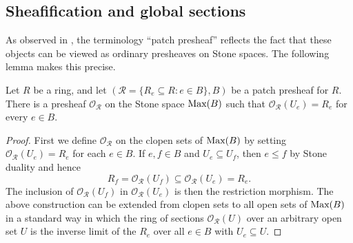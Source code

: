 \documentclass[11pt]{amsart}
\def\O{{\mathcal{O}}}
\begin{document}
\subsection[Sheafification and global sections]{Sheafification and global sections}\label{subsec: sheafification and global sections}

As observed in \cite[Section~3.2]{CosOlb}, the terminology ``patch presheaf'' reflects the fact that these objects can be viewed as ordinary presheaves on Stone spaces. The following lemma makes this precise.

\begin{lemma} \label{lem: presheaf from patch} Let $R$ be a ring, and let $({{\mathcal R}}=\{R_e\subseteq R:e\in B\}, B)$ be a patch presheaf for $R$. There is a presheaf $\O_{{\mathcal R}}$ on the Stone space $\mbox{\rm Max}(B)$ such that $\O_{{\mathcal R}}(U_e) = R_e$ for every $e\in B$. 
\end{lemma} 
\begin{proof} 
First we define $\O_{{\mathcal R}}$ on the clopen sets of   $\mbox{\rm Max}(B)$ by setting  $\O_{{\mathcal R}}(U_e) = R_e$ for each $e \in B$.
If $e,f \in B$ and $U_e \subseteq U_f$, then $e\le f$  by Stone duality and hence $$R_f = \O_{\mathcal R}(U_f) \subseteq \O_{\mathcal R}(U_e)=R_e.$$ The inclusion of $\O_{\mathcal R}(U_f)$ in $\O_{\mathcal R}(U_e)$ is then the restriction morphism.   The above construction can be extended from clopen sets to all open sets of $\mbox{\rm Max}(B)$ in a standard way in which the ring of sections $\O_{{\mathcal R}}(U)$ over an arbitrary open set $U$ is the inverse limit of the $R_e$ over all $e\in B$ with $U_e\subseteq U$.
\end{proof}
\end{document}
